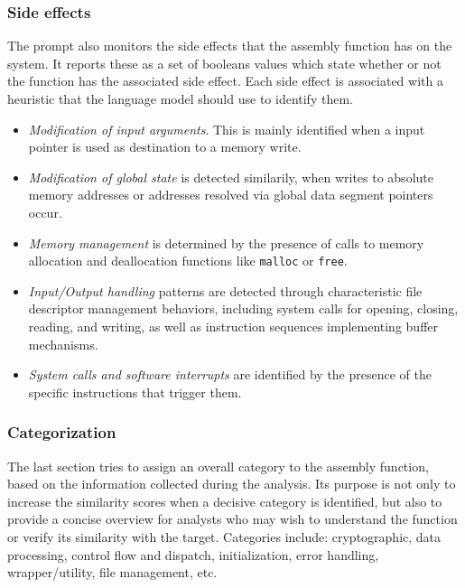 \subsubsection{Side effects}

The prompt also monitors the side effects that the assembly function has on the system.
It reports these as a set of booleans values which state whether or not the function has
the associated side effect. Each side effect is associated with a heuristic that the language model
should use to identify them.

\begin{itemize}
    \item \textit{Modification of input arguments}. This is mainly identified when a input pointer is used as destination to a memory write.
    \item \textit{Modification of global state} is detected similarily, when writes to absolute memory addresses or addresses resolved via global
        data segment pointers occur.
    \item \textit{Memory management} is determined by the presence of calls to memory allocation and deallocation
        functions like \texttt{malloc} or \texttt{free}.
    \item \textit{Input/Output handling} patterns are detected through characteristic file descriptor management behaviors, including system calls for opening, closing, reading, and writing, as well as instruction sequences implementing buffer mechanisms.
    \item \textit{System calls and software interrupts} are identified by the presence of the specific instructions that trigger them.
\end{itemize}

\subsubsection{Categorization}

The last section tries to assign an overall category to the assembly function, based on the information collected during the analysis.
Its purpose is not only to increase the similarity scores when a decisive category
is identified, but also to provide a concise overview for analysts who may wish to understand
the function or verify its similarity with the target. Categories include: cryptographic, data processing, control flow and dispatch,
initialization, error handling, wrapper/utility, file management, etc.

